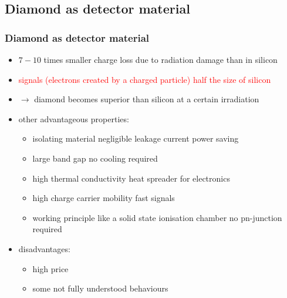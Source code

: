 \subsection{Diamond as detector material}
\begin{frame}
	\frametitle{Diamond as detector material}
	\begin{itemize}
		\setlength{\itemsep}{\fill}
		\item \textcolor{cadmiumgreen}{$7-10$ times smaller charge loss due to radiation damage than in silicon}
		\item \textcolor{red}{signals (electrons created by a charged particle) half the size of silicon}
		\item $\rightarrow$ diamond becomes superior than silicon at a certain irradiation
		\item other advantageous properties:
		\begin{itemize}
			\item isolating material \ra negligible leakage current \ra power saving 
			\item large band gap \ra no cooling required
			\item high thermal conductivity \ra heat spreader for electronics
			\item high charge carrier mobility \ra fast signals
			\item working principle like a solid state ionisation chamber \ra no pn-junction required
		\end{itemize}
		\item disadvantages:
		\begin{itemize}
			\item high price
			\item some not fully understood behaviours 
		\end{itemize}
	\end{itemize}
\end{frame}
